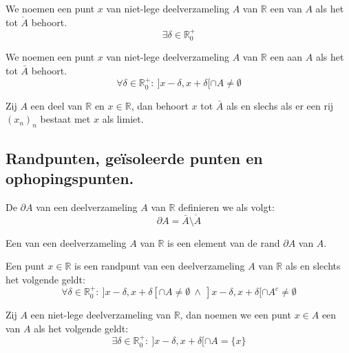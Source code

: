 \documentclass[main.tex]{subfiles}
\begin{document}
\begin{de}
  We noemen een punt $x$ van niet-lege deelverzameling $A$ van $\mathbb{R}$ een  van $A$ als het tot $\mathring{A}$ behoort.
  \[ \exists \delta \in \mathbb{R}_{0}^{+} \]
\end{de}

\begin{de}
  We noemen een punt $x$ van niet-lege deelverzameling $A$ van $\mathbb{R}$ een  aan $A$ als het tot $\bar{A}$ behoort.
  \[ \forall \delta \in \mathbb{R}_{0}^{+}:\ ]x-\delta, x+\delta[ \cap A \neq \emptyset \]
\end{de}

\begin{pr}
  Zij $A$ een deel van $\mathbb{R}$ en $x\in \mathbb{R}$, dan behoort $x$ tot $\bar{A}$ als en slechs als er een rij $(x_{n})_{n}$ bestaat met $x$ als limiet.
\end{pr}

\subsection{Randpunten, ge\"isoleerde punten en ophopingspunten.}
\label{sec:randp-geis-punt}

\begin{de}
  De  $\partial A$ van een deelverzameling $A$ van $\mathbb{R}$ definieren we als volgt:
  \[ \partial A = \bar{A} \setminus \mathring{A} \]
\end{de}

\begin{de}
  Een  van een deelverzameling $A$ van $\mathbb{R}$ is een element van de rand $\partial A$ van $A$.
\end{de}

\begin{st}
  Een punt $x\in \mathbb{R}$ is een randpunt van een deelverzameling $A$ van $\mathbb{R}$ als en slechts het volgende geldt:
  \[ \forall \delta \in \mathbb{R}_{0}^{+}:\ ]x-\delta,x+\delta[ \cap A \neq \emptyset\ \wedge\  ]x-\delta,x+\delta[ \cap A^{c} \neq \emptyset \]
\end{st}

\begin{de}
  Zij $A$ een niet-lege deelverzameling van $\mathbb{R}$, dan noemen we een punt $x\in A$ een  van $A$ als het volgende geldt:
  \[ \exists \delta \in \mathbb{R}_{0}^{+}:\ ]x-\delta,x+\delta[ \cap A = \{ x \} \]
\end{de}
\end{document}
